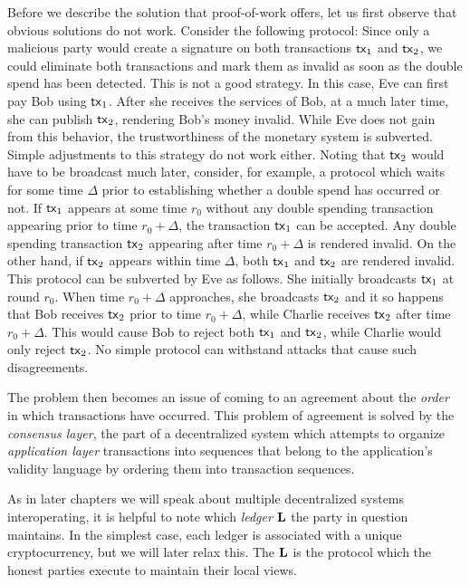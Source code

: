 Before we describe the solution that proof-of-work offers, let us first observe
that obvious solutions do not work. Consider the following protocol: Since only
a malicious party would create a signature on both transactions $\mathsf{tx}_1$ and
$\mathsf{tx}_2$, we could eliminate both transactions and mark them as invalid as soon
as the double spend has been detected. This is not a good strategy. In this
case, Eve can first pay Bob using $\mathsf{tx}_1$. After she receives the services of
Bob, at a much later time, she can publish $\mathsf{tx}_2$, rendering Bob's money
invalid. While Eve does not gain from this behavior, the trustworthiness of the
monetary system is subverted. Simple adjustments to this strategy do not work
either. Noting that $\mathsf{tx}_2$ would have to be broadcast much later, consider,
for example, a protocol which waits for some time $\Delta$ prior to establishing
whether a double spend has occurred or not. If $\mathsf{tx}_1$ appears at some time
$r_0$ without any double spending transaction appearing prior to time
$r_0 + \Delta$, the transaction $\mathsf{tx}_1$ can be accepted. Any double spending
transaction $\mathsf{tx}_2$ appearing after time $r_0 + \Delta$ is rendered invalid. On
the other hand, if $\mathsf{tx}_2$ appears within time $\Delta$, both $\mathsf{tx}_1$ and
$\mathsf{tx}_2$ are rendered invalid. This protocol can be subverted by Eve as follows.
She initially broadcasts $\mathsf{tx}_1$ at round $r_0$. When time $r_0 + \Delta$
approaches, she broadcasts $\mathsf{tx}_2$ and it so happens that Bob receives $\mathsf{tx}_2$
prior to time $r_0 + \Delta$, while Charlie receives $\mathsf{tx}_2$ after time
$r_0 + \Delta$. This would cause Bob to reject both $\mathsf{tx}_1$ and $\mathsf{tx}_2$, while
Charlie would only reject $\mathsf{tx}_2$. No simple protocol can withstand attacks that
cause such disagreements.

The problem then becomes an issue of coming to an agreement about the
\emph{order} in which transactions have occurred. This problem of agreement is
solved by the \emph{consensus layer}, the part of a decentralized system which
attempts to organize \emph{application layer} transactions into sequences that
belong to the application's validity language by ordering them into transaction
sequences.

As in later chapters we will speak about multiple decentralized systems
interoperating, it is helpful to note which \emph{ledger} $\mathbf{L}$
the party in question maintains. In the simplest case, each ledger is associated
with a unique cryptocurrency, but we will later relax this. The $\mathbf{L}$ is the
protocol which the honest parties execute to maintain their local views.

